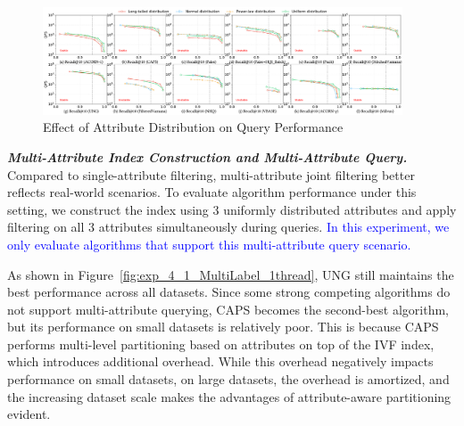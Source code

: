 \documentclass[sigconf, nonacm]{acmart}
\begin{document}
{	
	\begin{figure}
	\centering
	\setlength{\abovecaptionskip}{0.1cm}
	\setlength{\belowcaptionskip}{-0.25cm}
	\includegraphics[width=0.95\textwidth]{figures/exp/exp_3_1.pdf}
	\caption{
		Effect of Attribute Distribution on Query Performance}
		
	\label{fig:exp_3_1}

	\end{figure}
	
	
	
	
	
	\textit{\textbf{Multi-Attribute Index Construction and Multi-Attribute Query.}}  
	Compared to single-attribute filtering, multi-attribute joint filtering better reflects real-world scenarios. To evaluate algorithm performance under this setting, we construct the index using 3 uniformly distributed attributes and apply filtering on all 3 attributes simultaneously during queries. \textcolor{blue}{In this experiment, we only evaluate algorithms that support this multi-attribute query scenario.}
	
	As shown in Figure~\ref{fig:exp_4_1_MultiLabel_1thread}, UNG still maintains the best performance across all datasets. Since some strong competing algorithms do not support multi-attribute querying, CAPS becomes the second-best algorithm, but its performance on small datasets is relatively poor. This is because CAPS performs multi-level partitioning based on attributes on top of the IVF index, which introduces additional overhead. While this overhead negatively impacts performance on small datasets, on large datasets, the overhead is amortized, and the increasing dataset scale makes the advantages of attribute-aware partitioning evident.
	
}
\end{document}
